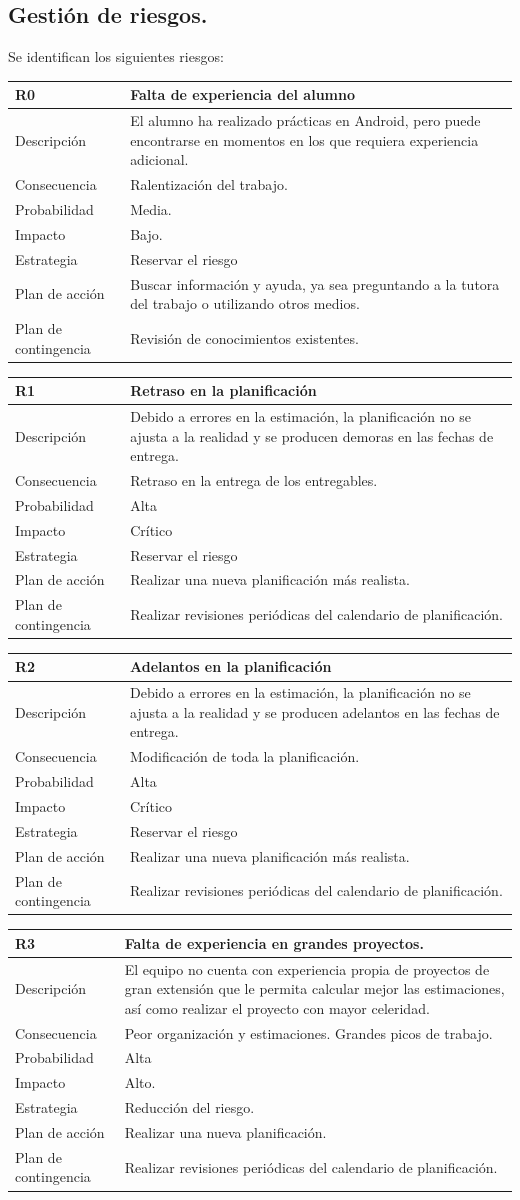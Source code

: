 \documentclass[twoside]{report}
\newcommand\addrow[2]{#1 &#2\\ }
\newcommand\addheading[2]{#1 &#2\\ \hline}
\newcommand\tabularhead{\begin{tabular}{lp{0.7\textwidth}}
\hline
}
\newenvironment{risk}{\tabularhead}
{\hline\end{tabular}}
\begin{document}
\subsection{Gestión de riesgos.}

Se identifican los siguientes riesgos:

\begin{risk}
  \addheading{R0}{Falta de experiencia del alumno}
  \addrow{Descripción}{El alumno ha realizado prácticas en Android, pero puede encontrarse en momentos en los que requiera experiencia adicional.}
  \addrow{Consecuencia}{Ralentización del trabajo.}
  \addrow{Probabilidad}{Media.}
  \addrow{Impacto}{Bajo.}
  \addrow{Estrategia}{Reservar el riesgo}
  \addrow{Plan de acción}{Buscar información y ayuda, ya sea preguntando a la tutora del trabajo o utilizando otros medios.}
  \addrow{Plan de contingencia}{Revisión de conocimientos existentes.}
\end{risk}

\begin{risk}
  \addheading{R1}{Retraso en la planificación}
  \addrow{Descripción}{Debido a errores en la estimación, la planificación no se ajusta a la realidad y se producen demoras en las fechas de entrega.}
  \addrow{Consecuencia}{Retraso en la entrega de los entregables.}
  \addrow{Probabilidad}{Alta }
  \addrow{Impacto}{Crítico}
  \addrow{Estrategia}{Reservar el riesgo}
  \addrow{Plan de acción}{Realizar una nueva planificación más realista. }
  \addrow{Plan de contingencia}{Realizar revisiones periódicas del calendario de planificación.}
\end{risk}

\begin{risk}
  \addheading{R2}{Adelantos en la planificación}
  \addrow{Descripción}{Debido a errores en la estimación, la planificación no se ajusta a la realidad y se producen adelantos en las fechas de entrega.}
  \addrow{Consecuencia}{Modificación de toda la planificación.}
  \addrow{Probabilidad}{Alta }
  \addrow{Impacto}{Crítico}
  \addrow{Estrategia}{Reservar el riesgo}
  \addrow{Plan de acción}{Realizar una nueva planificación más realista. }
  \addrow{Plan de contingencia}{Realizar revisiones periódicas del calendario de planificación.}
\end{risk}

\begin{risk}
  \addheading{R3}{Falta de experiencia en grandes proyectos.}
  \addrow{Descripción}{El equipo no cuenta con experiencia propia de proyectos de gran extensión que le permita calcular mejor las estimaciones, así como realizar el proyecto con mayor celeridad.}
  \addrow{Consecuencia}{Peor organización y estimaciones. Grandes picos de trabajo.}
  \addrow{Probabilidad}{Alta }
  \addrow{Impacto}{Alto. }
  \addrow{Estrategia}{Reducción del riesgo.}
  \addrow{Plan de acción}{Realizar una nueva planificación. }
  \addrow{Plan de contingencia}{Realizar revisiones periódicas del calendario de planificación.}
\end{risk}
\end{document}
